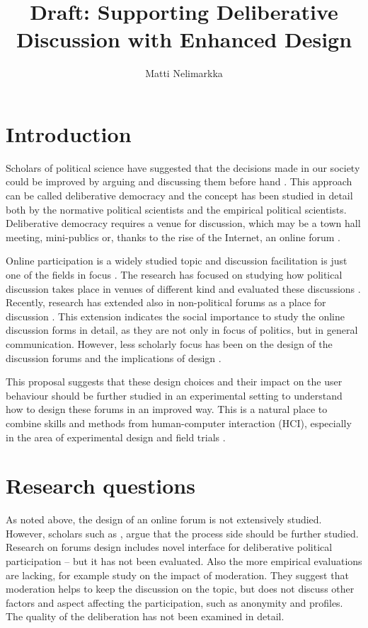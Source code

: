 \documentclass[journal,a4paper]{IEEEtran}
\author{Matti Nelimarkka}
\title{Draft: Supporting Deliberative Discussion with Enhanced Design}
\begin{document}
\maketitle

\setlength{\parindent}{0pt}
\setlength{\parskip}{1ex}

\section{Introduction}
Scholars of political science have suggested that the decisions made in our society could be improved by arguing and discussing them before hand . This approach can be called deliberative democracy and the concept has been studied in detail both by the normative political scientists and the empirical political scientists. Deliberative democracy requires a venue for discussion, which may be a town hall meeting, mini-publics or, thanks to the rise of the Internet, an online forum .

Online participation is a widely studied topic and discussion facilitation is just one of the fields in focus . The research has focused on studying how political discussion takes place in venues of different kind  and evaluated these discussions . Recently, research has extended also in non-political forums as a place for discussion \cite{graham12}. This extension indicates the social importance to study the online discussion forms in detail, as they are not only in focus of politics, but in general communication. However, less scholarly focus has been on the design of the discussion forums and the implications of design .

This proposal suggests that these design choices and their impact on the user behaviour should be further studied in an experimental setting to understand how to design these forums in an improved way. This is a natural place to combine skills and methods from human-computer interaction (HCI), especially in the area of experimental design and field trials .

\section{Research questions}
As noted above, the design of an online forum is not extensively studied. However, scholars such as , argue that the process side should be further studied.  Research on forums design includes  novel interface for deliberative political participation -- but it has not been evaluated. Also the more empirical evaluations are lacking, for example  study on the impact of moderation. They suggest that moderation helps to keep the discussion on the topic, but does not discuss other factors and aspect affecting the participation, such as anonymity and profiles. The quality of the deliberation has not been examined in detail.
\end{document}
